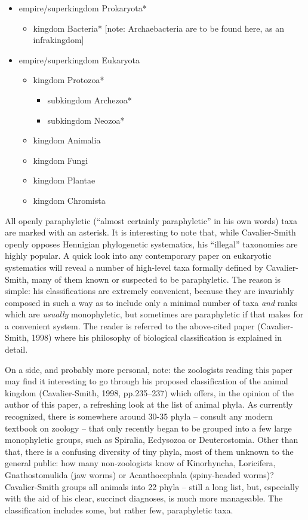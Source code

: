 \documentclass[a4paper]{article}
\begin{document}
\begin{itemize}
\item empire/superkingdom Prokaryota*

\begin{itemize}
\item kingdom Bacteria* [note: Archaebacteria are to be found here, as an infrakingdom]
\end{itemize}
\item empire/superkingdom Eukaryota

\begin{itemize}
\item kingdom Protozoa*

\begin{itemize}
\item subkingdom Archezoa*
\item subkingdom Neozoa*
\end{itemize}
\item kingdom Animalia
\item kingdom Fungi
\item kingdom Plantae
\item kingdom Chromista
\end{itemize}
\end{itemize}
All openly paraphyletic (“almost certainly paraphyletic” in his own words) taxa are marked with an asterisk. It is
interesting to note that, while Cavalier-Smith openly opposes Hennigian phylogenetic systematics, his “illegal”
taxonomies are highly popular. A quick look into any contemporary paper on eukaryotic systematics will reveal a number
of high-level taxa formally defined by Cavalier-Smith, many of them known or suspected to be paraphyletic. The reason
is simple: his classifications are extremely convenient, because they are invariably composed in such a way as to
include only a minimal number of taxa \textit{and} ranks which are \textit{usually }monophyletic, but sometimes are
paraphyletic if that makes for a convenient system. The reader is referred to the above-cited paper (Cavalier-Smith,
1998) where his philosophy of biological classification is explained in detail.

On a side, and probably more personal, note: the zoologists reading this paper may find it interesting to go through his
proposed classification of the animal kingdom \label{ref:RNDayLTgHPurs}(Cavalier-Smith, 1998, pp.235–237) which offers,
in the opinion of the author of this paper, a refreshing look at the list of animal phyla. As currently recognized,
there is somewhere around 30-35 phyla – consult any modern textbook on zoology – that only recently began to be grouped
into a few large monophyletic groups, such as Spiralia, Ecdysozoa or Deuterostomia. Other than that, there is a
confusing diversity of tiny phyla, most of them unknown to the general public: how many non-zoologists know of
Kinorhyncha, Loricifera, Gnathostomulida (jaw worms) or Acanthocephala (spiny-headed worms)? Cavalier-Smith groups all
animals into 22 phyla – still a long list, but, especially with the aid of his clear, succinct diagnoses, is much more
manageable. The classification includes some, but rather few, paraphyletic taxa.
\end{document}
